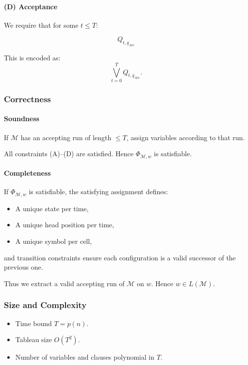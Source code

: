 \documentclass{article}
\begin{document}
\paragraph{(D) Acceptance}

We require that for some $t \le T$:

\[
Q_{t,q_{Acc}}
\]

This is encoded as:
\[
\bigvee_{t=0}^{T} Q_{t,q_{Acc}}.
\]

\subsubsection*{Correctness}

\paragraph{Soundness}

If $\mathcal{M}$ has an accepting run of length $\le T$,
assign variables according to that run.

All constraints (A)--(D) are satisfied.
Hence $\Phi_{\mathcal{M},w}$ is satisfiable.

\paragraph{Completeness}

If $\Phi_{\mathcal{M},w}$ is satisfiable,
the satisfying assignment defines:

\begin{itemize}
    \item A unique state per time,
    \item A unique head position per time,
    \item A unique symbol per cell,
\end{itemize}

and transition constraints ensure each configuration
is a valid successor of the previous one.

Thus we extract a valid accepting run of $\mathcal{M}$ on $w$.
Hence $w \in L(\mathcal{M})$.

\subsubsection*{Size and Complexity}

\begin{itemize}
    \item Time bound $T = p(n)$.
    \item Tableau size $O(T^2)$.
    \item Number of variables and clauses polynomial in $T$.
\end{itemize}
\end{document}
